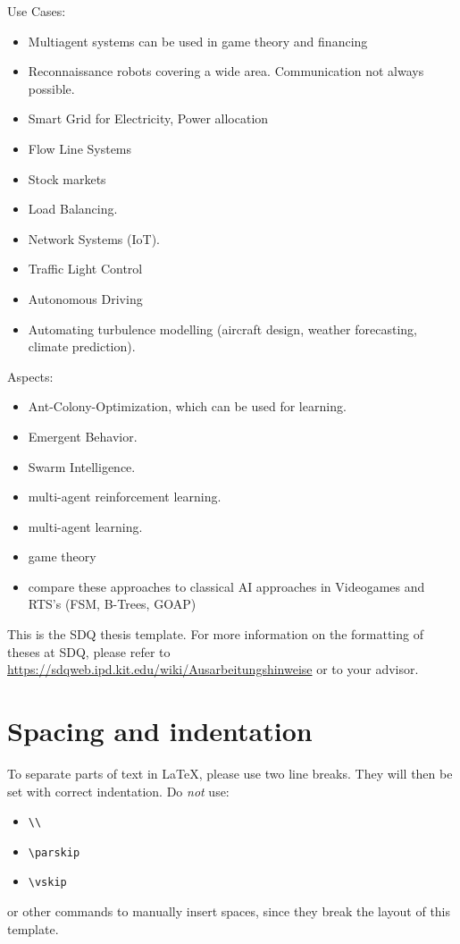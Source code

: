 Use Cases:
\begin{itemize}[noitemsep,nolistsep]
	\item Multiagent systems can be used in game theory and financing
	\item Reconnaissance robots covering a wide area. Communication not always possible.
	\item Smart Grid for Electricity, Power allocation
	\item Flow Line Systems
	\item Stock markets
	\item Load Balancing.
	\item Network Systems (IoT).
	\item Traffic Light Control
	\item Autonomous Driving
	\item Automating turbulence modelling (aircraft design, weather forecasting, climate prediction).
\end{itemize}
Aspects:
\begin{itemize}[noitemsep,nolistsep]
	\item Ant-Colony-Optimization, which can be used for learning.
	\item Emergent Behavior.
	\item Swarm Intelligence.
	\item multi-agent reinforcement learning.
	\item multi-agent learning.
	\item game theory
	\item compare these approaches to classical AI approaches in Videogames and RTS's (FSM, B-Trees, GOAP)
\end{itemize}



This is the SDQ thesis template.
For more information on the formatting of theses at SDQ, please refer to
\url{https://sdqweb.ipd.kit.edu/wiki/Ausarbeitungshinweise} or to your advisor.

\section{Spacing and indentation}
To separate parts of text in \LaTeX, please use two line breaks.
They will then be set with correct indentation.
Do \emph{not} use:
\begin{itemize}
  \itemsep0em
  \item \texttt{\textbackslash\textbackslash}
  \item \texttt{\textbackslash parskip}
  \item \texttt{\textbackslash vskip}
\end{itemize} 
or other commands to manually insert spaces, since they break the layout of this template.

